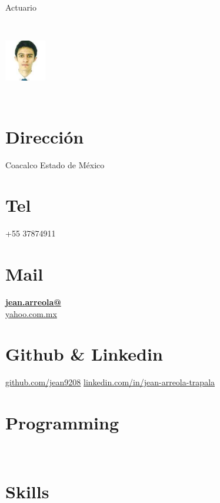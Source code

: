 \documentclass[]{friggeri-cv}
\begin{document}
      {Actuario}
      

\begin{aside}
  \includegraphics[width = 1.8cm, height = 3.5cm]{img/jeanarreola}
  \section{Dirección}
    Coacalco
    Estado de México
    ~
  \section{Tel}
    +55 37874911
    ~
  \section{Mail}
    \href{mailto:jean.arreola@yahoo.com}{\textbf{jean.arreola@}\\yahoo.com.mx}
    ~
  \section{Github \& Linkedin}
    \href{https://github.com/jean9208}{github.com/jean9208}
    \href{https://www.linkedin.com/in/jean-arreola-trapala/}{linkedin.com/in/jean-arreola-trapala}
    ~
  \section{Programming}
    ~
  \section{Skills}
    ~
\end{aside}
~
\end{document}
